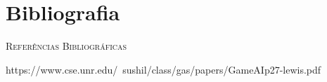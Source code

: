 
\chapter{Bibliografia}
\label{cap:Bibliografia}

\textsc{Referências Bibliográficas} 

\textnormal{https://www.cse.unr.edu/~sushil/class/gas/papers/GameAIp27-lewis.pdf}
